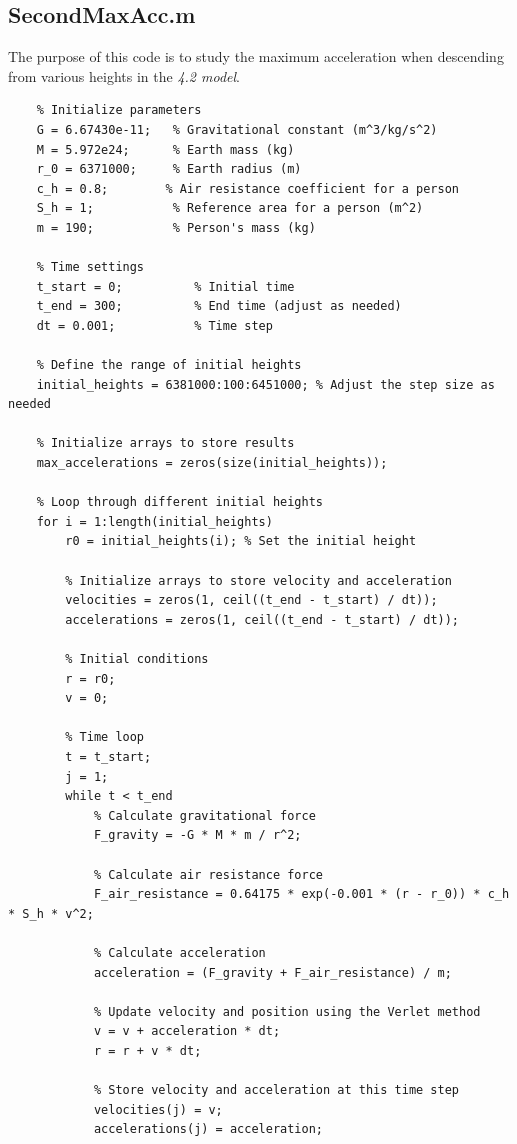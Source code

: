 \documentclass[12pt]{article}
\begin{document}
\subsection{SecondMaxAcc.m}
The purpose of this code is to study the maximum 
acceleration when descending from various heights in the \textit{4.2 model}.
\begin{lstlisting}
    % Initialize parameters
    G = 6.67430e-11;   % Gravitational constant (m^3/kg/s^2)
    M = 5.972e24;      % Earth mass (kg)
    r_0 = 6371000;     % Earth radius (m)
    c_h = 0.8;        % Air resistance coefficient for a person
    S_h = 1;           % Reference area for a person (m^2)
    m = 190;           % Person's mass (kg)

    % Time settings
    t_start = 0;          % Initial time
    t_end = 300;          % End time (adjust as needed)
    dt = 0.001;           % Time step

    % Define the range of initial heights
    initial_heights = 6381000:100:6451000; % Adjust the step size as needed

    % Initialize arrays to store results
    max_accelerations = zeros(size(initial_heights));

    % Loop through different initial heights
    for i = 1:length(initial_heights)
        r0 = initial_heights(i); % Set the initial height
        
        % Initialize arrays to store velocity and acceleration
        velocities = zeros(1, ceil((t_end - t_start) / dt));
        accelerations = zeros(1, ceil((t_end - t_start) / dt));
        
        % Initial conditions
        r = r0;
        v = 0;
        
        % Time loop
        t = t_start;
        j = 1;
        while t < t_end
            % Calculate gravitational force
            F_gravity = -G * M * m / r^2;
            
            % Calculate air resistance force
            F_air_resistance = 0.64175 * exp(-0.001 * (r - r_0)) * c_h * S_h * v^2;
            
            % Calculate acceleration
            acceleration = (F_gravity + F_air_resistance) / m;
            
            % Update velocity and position using the Verlet method
            v = v + acceleration * dt;
            r = r + v * dt;
            
            % Store velocity and acceleration at this time step
            velocities(j) = v;
            accelerations(j) = acceleration;
            

\end{lstlisting}
\end{document}
